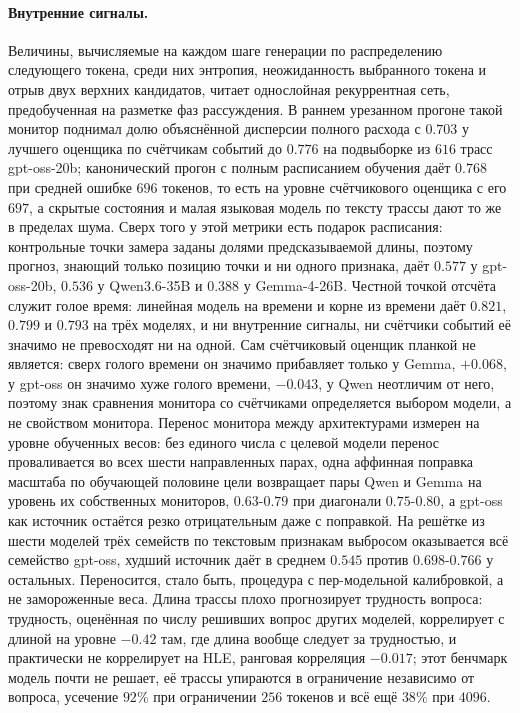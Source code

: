 \documentclass[11pt]{article}
\begin{document}
\paragraph{Внутренние сигналы.} Величины, вычисляемые на каждом шаге генерации по распределению следующего токена, среди них энтропия, неожиданность выбранного токена и отрыв двух верхних кандидатов, читает однослойная рекуррентная сеть, предобученная на разметке фаз рассуждения. В раннем урезанном прогоне такой монитор поднимал долю объяснённой дисперсии полного расхода с $0.703$ у лучшего оценщика по счётчикам событий до $0.776$ на подвыборке из $616$ трасс gpt-oss-20b; канонический прогон с полным расписанием обучения даёт $0.768$ при средней ошибке $696$ токенов, то есть на уровне счётчикового оценщика с его $697$, а скрытые состояния и малая языковая модель по тексту трассы дают то же в пределах шума. Сверх того у этой метрики есть подарок расписания: контрольные точки замера заданы долями предсказываемой длины, поэтому прогноз, знающий только позицию точки и ни одного признака, даёт $0.577$ у gpt-oss-20b, $0.536$ у Qwen3.6-35B и $0.388$ у Gemma-4-26B. Честной точкой отсчёта служит голое время: линейная модель на времени и корне из времени даёт $0.821$, $0.799$ и $0.793$ на трёх моделях, и ни внутренние сигналы, ни счётчики событий её значимо не превосходят ни на одной. Сам счётчиковый оценщик планкой не является: сверх голого времени он значимо прибавляет только у Gemma, $+0.068$, у gpt-oss он значимо хуже голого времени, $-0.043$, у Qwen неотличим от него, поэтому знак сравнения монитора со счётчиками определяется выбором модели, а не свойством монитора. Перенос монитора между архитектурами измерен на уровне обученных весов: без единого числа с целевой модели перенос проваливается во всех шести направленных парах, одна аффинная поправка масштаба по обучающей половине цели возвращает пары Qwen и Gemma на уровень их собственных мониторов, $0.63$-$0.79$ при диагонали $0.75$-$0.80$, а gpt-oss как источник остаётся резко отрицательным даже с поправкой. На решётке из шести моделей трёх семейств по текстовым признакам выбросом оказывается всё семейство gpt-oss, худший источник даёт в среднем $0.545$ против $0.698$-$0.766$ у остальных. Переносится, стало быть, процедура с пер-модельной калибровкой, а не замороженные веса. Длина трассы плохо прогнозирует трудность вопроса: трудность, оценённая по числу решивших вопрос других моделей, коррелирует с длиной на уровне $-0.42$ там, где длина вообще следует за трудностью, и практически не коррелирует на HLE, ранговая корреляция $-0.017$; этот бенчмарк модель почти не решает, её трассы упираются в ограничение независимо от вопроса, усечение $92\%$ при ограничении $256$ токенов и всё ещё $38\%$ при $4096$.
\end{document}
